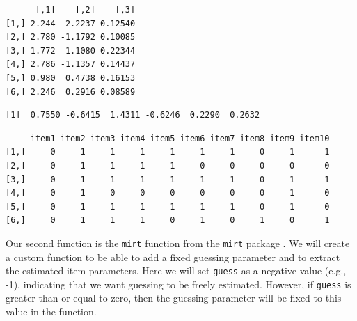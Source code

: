 \documentclass[
]{book}
\newenvironment{Shaded}{\begin{snugshade}}{\end{snugshade}}
\newcommand{\DataTypeTok}[1]{\textcolor[rgb]{0.13,0.29,0.53}{#1}}
\newcommand{\DecValTok}[1]{\textcolor[rgb]{0.00,0.00,0.81}{#1}}
\newcommand{\KeywordTok}[1]{\textcolor[rgb]{0.13,0.29,0.53}{\textbf{#1}}}
\newcommand{\NormalTok}[1]{#1}
\newcommand{\OperatorTok}[1]{\textcolor[rgb]{0.81,0.36,0.00}{\textbf{#1}}}
\newcommand{\StringTok}[1]{\textcolor[rgb]{0.31,0.60,0.02}{#1}}
\begin{document}
\begin{Shaded}
\end{Shaded}

\begin{verbatim}
      [,1]    [,2]    [,3]
[1,] 2.244  2.2237 0.12540
[2,] 2.780 -1.1792 0.10085
[3,] 1.772  1.1080 0.22344
[4,] 2.786 -1.1357 0.14437
[5,] 0.980  0.4738 0.16153
[6,] 2.246  0.2916 0.08589
\end{verbatim}

\begin{verbatim}
[1]  0.7550 -0.6415  1.4311 -0.6246  0.2290  0.2632
\end{verbatim}

\begin{verbatim}
     item1 item2 item3 item4 item5 item6 item7 item8 item9 item10
[1,]     0     1     1     1     1     1     1     0     1      1
[2,]     0     1     1     1     1     0     0     0     0      0
[3,]     0     1     1     1     1     1     1     0     1      1
[4,]     0     1     0     0     0     0     0     0     1      0
[5,]     0     1     1     1     1     1     1     0     1      0
[6,]     0     1     1     1     0     1     0     1     0      1
\end{verbatim}

Our second function is the \texttt{mirt} function from the \texttt{mirt} package \citep{R-mirt}. We will create a custom function to be able to add a fixed guessing parameter and to extract the estimated item parameters. Here we will set \texttt{guess} as a negative value (e.g., -1), indicating that we want guessing to be freely estimated. However, if \texttt{guess} is greater than or equal to zero, then the guessing parameter will be fixed to this value in the function.
\end{document}
